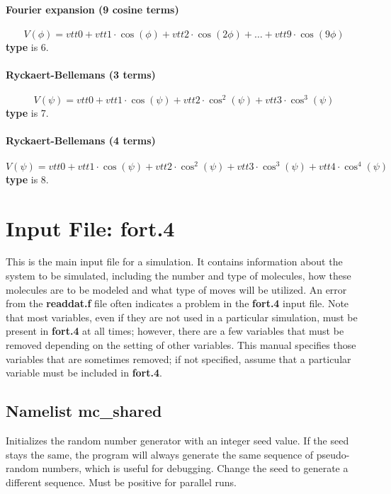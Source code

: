 \documentclass[12pt,letterpaper]{article}
\begin{document}
\paragraph{Fourier expansion (9 cosine terms)}
\begin{equation}
V(\phi) = vtt0 + vtt1\cdot\cos(\phi) + vtt2\cdot\cos(2\phi) + \dots
+ vtt9\cdot\cos(9\phi)
\end{equation}
{\bf type} is 6.

\paragraph{Ryckaert-Bellemans (3 terms)}
\begin{equation}
V(\psi) = vtt0 + vtt1\cdot\cos(\psi) + vtt2\cdot\cos^2(\psi) + vtt3\cdot\cos^3(\psi)
\end{equation}
{\bf type} is 7.

\paragraph{Ryckaert-Bellemans (4 terms)}
\begin{equation}
V(\psi) = vtt0 + vtt1\cdot\cos(\psi) + vtt2\cdot\cos^2(\psi) + vtt3\cdot\cos^3(\psi) + vtt4\cdot\cos^4(\psi)
\end{equation}
{\bf type} is 8.

\section{Input File: \textbf{fort.4}}
This is the main input file for a simulation. It contains
information about the system to be simulated, including the
number and type of molecules, how these molecules are to be
modeled and what type of moves will be utilized. An error
from the {\bf readdat.f} file often indicates a problem in
the {\bf fort.4} input file. Note that most variables, even
if they are not used in a particular simulation, must be
present in {\bf fort.4} at all times; however, there are a
few variables that must be removed depending on the setting
of other variables. This manual specifies those variables
that are sometimes removed; if not specified, assume that a
particular variable must be included in {\bf fort.4}.

\subsection{Namelist \textbf{mc\_shared}}
 Initializes the random number generator
with an integer seed value. If the seed stays the same, the
program will always generate the same sequence of
pseudo-random numbers, which is useful for debugging. Change
the seed to generate a different sequence. Must be positive
for parallel runs.
\end{document}
